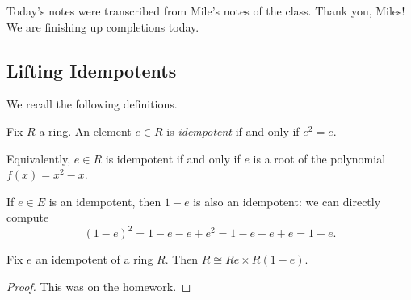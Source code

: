 
Today's notes were transcribed from Mile's notes of the class. Thank you, Miles! We are finishing up completions today.

\subsection{Lifting Idempotents}
We recall the following definitions.
\begin{definition}[Idempotent]
	Fix $R$ a ring. An element $e\in R$ is \textit{idempotent} if and only if $e^2=e$.
\end{definition} %
\begin{remark}
	Equivalently, $e\in R$ is idempotent if and only if $e$ is a root of the polynomial $f(x)=x^2-x$.
\end{remark}
\begin{example}
	If $e\in E$ is an idempotent, then $1-e$ is also an idempotent: we can directly compute
	\[(1-e)^2=1-e-e+e^2=1-e-e+e=1-e.\]
\end{example}
\begin{lemma} \label{lem:basicidempdecomp}
	Fix $e$ an idempotent of a ring $R$. Then $R\cong Re\times R(1-e)$.
\end{lemma}
\begin{proof}
	This was on the homework.
\end{proof}

